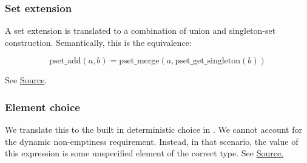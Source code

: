 \subsubsection{Set extension}


\begin{mathpar}
\end{mathpar}
A set extension is translated to a combination of union and singleton-set construction. Semantically, this is the equivalence:

\[
\mathrm{pset\_add}(a,b) = \mathrm{pset\_merge}(a, \mathrm{pset\_get\_singleton}(b))
\]

See
\href{https://github.com/saltiniroberto/ssf/blob/7ea6e18093d9da3154b4e396dd435549f687e6b9/high_level/common/pythonic_code_generic.py#L54-L55}{Source}.

\subsubsection{Element choice}


\begin{mathpar}
\end{mathpar}

We translate this to the built in deterministic choice in \tlap{}. We cannot
account for the dynamic non-emptiness requirement. Instead, in that scenario,
the value of this expression is some unspecified element of the correct type.
See
\href{https://github.com/saltiniroberto/ssf/blob/7ea6e18093d9da3154b4e396dd435549f687e6b9/high_level/common/pythonic_code_generic.py#L58-L60}{Source.}


